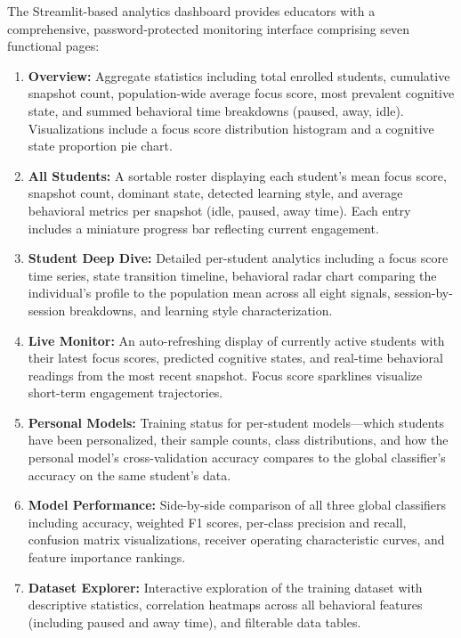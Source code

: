 \documentclass[conference]{IEEEtran}
\begin{document}
The Streamlit-based analytics dashboard provides educators with a comprehensive, password-protected monitoring interface comprising seven functional pages:

\begin{enumerate}[leftmargin=*]
    \item \textbf{Overview:} Aggregate statistics including total enrolled students, cumulative snapshot count, population-wide average focus score, most prevalent cognitive state, and summed behavioral time breakdowns (paused, away, idle). Visualizations include a focus score distribution histogram and a cognitive state proportion pie chart.

    \item \textbf{All Students:} A sortable roster displaying each student's mean focus score, snapshot count, dominant state, detected learning style, and average behavioral metrics per snapshot (idle, paused, away time). Each entry includes a miniature progress bar reflecting current engagement.

    \item \textbf{Student Deep Dive:} Detailed per-student analytics including a focus score time series, state transition timeline, behavioral radar chart comparing the individual's profile to the population mean across all eight signals, session-by-session breakdowns, and learning style characterization.

    \item \textbf{Live Monitor:} An auto-refreshing display of currently active students with their latest focus scores, predicted cognitive states, and real-time behavioral readings from the most recent snapshot. Focus score sparklines visualize short-term engagement trajectories.

    \item \textbf{Personal Models:} Training status for per-student models---which students have been personalized, their sample counts, class distributions, and how the personal model's cross-validation accuracy compares to the global classifier's accuracy on the same student's data.

    \item \textbf{Model Performance:} Side-by-side comparison of all three global classifiers including accuracy, weighted F1 scores, per-class precision and recall, confusion matrix visualizations, receiver operating characteristic curves, and feature importance rankings.

    \item \textbf{Dataset Explorer:} Interactive exploration of the training dataset with descriptive statistics, correlation heatmaps across all behavioral features (including paused and away time), and filterable data tables.
\end{enumerate}
\end{document}
